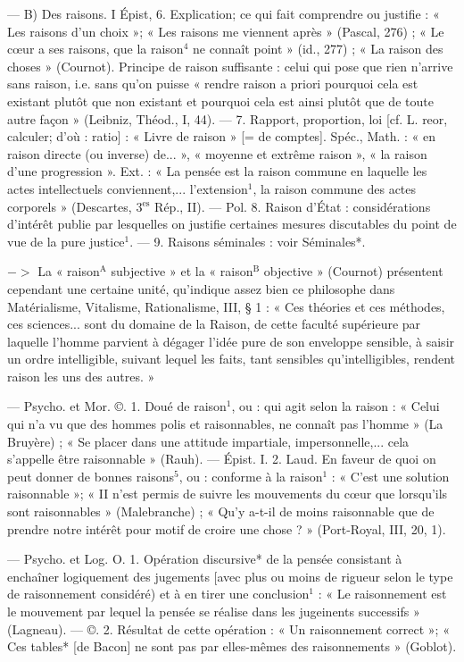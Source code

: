 \begin{itemize}[leftmargin=1cm, label=, itemsep=1pt]
— B) Des raisons. I  Épist,
6. Explication; ce qui fait comprendre ou justifie : « Les raisons
d’un choix »; « Les raisons me viennent
après » (Pascal, 276) ; « Le
cœur a ses raisons, que la raison$^4$ ne
connaît point » (id., 277) ; « La raison
des choses » (Cournot). Principe de
raison suffisante : celui qui pose que
rien n'arrive sans raison, i.e. sans
qu'on puisse « rendre raison a
priori pourquoi cela est existant
plutôt que non existant et pourquoi
cela est ainsi plutôt que de toute
autre façon » (Leibniz, Théod., I, 44).
— 7. Rapport, proportion, loi [cf.
L. reor, calculer; d’où : ratio] :
« Livre de raison » [= de comptes].
Spéc., Math. : « en raison directe (ou
inverse) de... », « moyenne et extrême
raison », « la raison d’une progression ». Ext. : « La pensée est la
raison commune en laquelle les
actes intellectuels conviennent,...
l’extension$^1$, la raison commune des
actes corporels » (Descartes, 3$^\text{es}$ Rép.,
II). — Pol. 8. Raison d'État : considérations d'intérêt publie par lesquelles on justifie certaines mesures discutables du point de vue
de la pure justice$^1$. — 9. Raisons
séminales : voir Séminales*.

$->$ La « raison$^\text{A}$ subjective » et
la « raison$^\text{B}$ objective » (Cournot)
présentent cependant une certaine
unité, qu’indique assez bien ce philosophe dans Matérialisme, Vitalisme, Rationalisme, III, § 1 : « Ces
théories et ces méthodes, ces sciences... sont du domaine de la Raison,
de cette faculté supérieure par laquelle l’homme parvient à dégager
l'idée pure de son enveloppe sensible, à saisir un ordre intelligible,
suivant lequel les faits, tant sensibles qu'intelligibles, rendent raison
les uns des autres. »

 — Psycho. et Mor. ©.
1. Doué de raison$^1$, ou : qui agit
selon la raison : « Celui qui n’a vu
que des hommes polis et raisonnables,
ne connaît pas l’homme »
(La Bruyère) ; « Se placer dans
une attitude impartiale, impersonnelle,... cela s'appelle être raisonnable » (Rauh). — Épist. I. 2. Laud.
En faveur de quoi on peut donner de
bonnes raisons$^5$, ou : conforme à la
raison$^1$ : « C’est une solution raisonnable »; « II n’est permis de suivre
les mouvements du cœur que lorsqu’ils sont raisonnables » (Malebranche) ; « Qu’y a-t-il de moins
raisonnable que de prendre notre
intérêt pour motif de croire une
chose ? » (Port-Royal, III, 20, 1).

 — Psycho. et Log.
O. 1. Opération discursive* de la
pensée consistant à enchaîner logiquement des jugements [avec plus
ou moins de rigueur selon le type
de raisonnement considéré) et à en
tirer une conclusion$^1$ : « Le raisonnement est le mouvement par lequel
la pensée se réalise dans les jugeinents successifs » (Lagneau). —
©. 2. Résultat de cette opération :
« Un raisonnement correct »; « Ces
tables* [de Bacon] ne sont pas par
elles-mêmes des raisonnements »
(Goblot).


\end{itemize}
